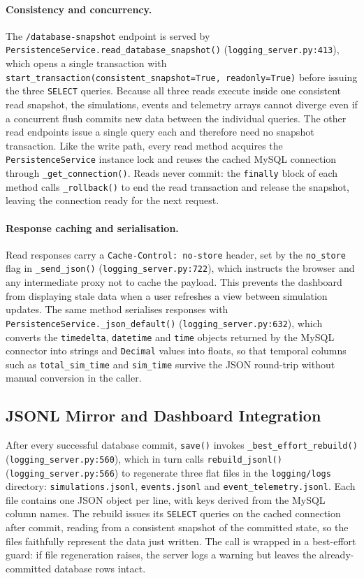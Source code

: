 \paragraph{Consistency and concurrency.}
The \texttt{/database-snapshot} endpoint is served by \texttt{PersistenceService.read\_database\_snapshot()} (\texttt{logging\_server.py:413}), which opens a single transaction with \texttt{start\_transaction(consistent\_snapshot=True, readonly=True)} before issuing the three \texttt{SELECT} queries. Because all three reads execute inside one consistent read snapshot, the simulations, events and telemetry arrays cannot diverge even if a concurrent flush commits new data between the individual queries. The other read endpoints issue a single query each and therefore need no snapshot transaction. Like the write path, every read method acquires the \texttt{PersistenceService} instance lock and reuses the cached MySQL connection through \texttt{\_get\_connection()}. Reads never commit: the \texttt{finally} block of each method calls \texttt{\_rollback()} to end the read transaction and release the snapshot, leaving the connection ready for the next request.

\paragraph{Response caching and serialisation.}
Read responses carry a \texttt{Cache-Control: no-store} header, set by the \texttt{no\_store} flag in \texttt{\_send\_json()} (\texttt{logging\_server.py:722}), which instructs the browser and any intermediate proxy not to cache the payload. This prevents the dashboard from displaying stale data when a user refreshes a view between simulation updates. The same method serialises responses with \texttt{PersistenceService.\_json\_default()} (\texttt{logging\_server.py:632}), which converts the \texttt{timedelta}, \texttt{datetime} and \texttt{time} objects returned by the MySQL connector into strings and \texttt{Decimal} values into floats, so that temporal columns such as \texttt{total\_sim\_time} and \texttt{sim\_time} survive the JSON round-trip without manual conversion in the caller.

\subsection{JSONL Mirror and Dashboard Integration}
\label{sec:logger-jsonl}

After every successful database commit, \texttt{save()} invokes \texttt{\_best\_effort\_rebuild()} (\texttt{logging\_server.py:560}), which in turn calls \texttt{rebuild\_jsonl()} (\texttt{logging\_server.py:566}) to regenerate three flat files in the \texttt{logging/logs} directory: \texttt{simulations.jsonl}, \texttt{events.jsonl} and \texttt{event\_telemetry.jsonl}. Each file contains one JSON object per line, with keys derived from the MySQL column names. The rebuild issues its \texttt{SELECT} queries on the cached connection after commit, reading from a consistent snapshot of the committed state, so the files faithfully represent the data just written. The call is wrapped in a best-effort guard: if file regeneration raises, the server logs a warning but leaves the already-committed database rows intact.

